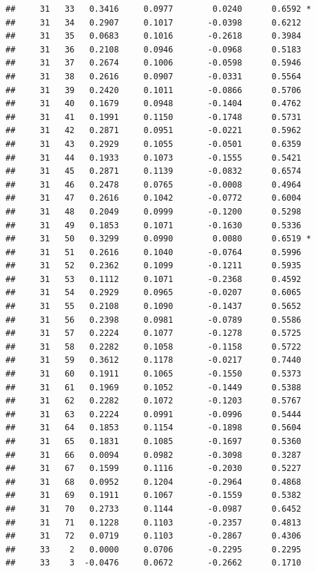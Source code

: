 \documentclass[
]{article}
\begin{document}
\begin{verbatim}
##     31   33   0.3416     0.0977        0.0240      0.6592 *
##     31   34   0.2907     0.1017       -0.0398      0.6212  
##     31   35   0.0683     0.1016       -0.2618      0.3984  
##     31   36   0.2108     0.0946       -0.0968      0.5183  
##     31   37   0.2674     0.1006       -0.0598      0.5946  
##     31   38   0.2616     0.0907       -0.0331      0.5564  
##     31   39   0.2420     0.1011       -0.0866      0.5706  
##     31   40   0.1679     0.0948       -0.1404      0.4762  
##     31   41   0.1991     0.1150       -0.1748      0.5731  
##     31   42   0.2871     0.0951       -0.0221      0.5962  
##     31   43   0.2929     0.1055       -0.0501      0.6359  
##     31   44   0.1933     0.1073       -0.1555      0.5421  
##     31   45   0.2871     0.1139       -0.0832      0.6574  
##     31   46   0.2478     0.0765       -0.0008      0.4964  
##     31   47   0.2616     0.1042       -0.0772      0.6004  
##     31   48   0.2049     0.0999       -0.1200      0.5298  
##     31   49   0.1853     0.1071       -0.1630      0.5336  
##     31   50   0.3299     0.0990        0.0080      0.6519 *
##     31   51   0.2616     0.1040       -0.0764      0.5996  
##     31   52   0.2362     0.1099       -0.1211      0.5935  
##     31   53   0.1112     0.1071       -0.2368      0.4592  
##     31   54   0.2929     0.0965       -0.0207      0.6065  
##     31   55   0.2108     0.1090       -0.1437      0.5652  
##     31   56   0.2398     0.0981       -0.0789      0.5586  
##     31   57   0.2224     0.1077       -0.1278      0.5725  
##     31   58   0.2282     0.1058       -0.1158      0.5722  
##     31   59   0.3612     0.1178       -0.0217      0.7440  
##     31   60   0.1911     0.1065       -0.1550      0.5373  
##     31   61   0.1969     0.1052       -0.1449      0.5388  
##     31   62   0.2282     0.1072       -0.1203      0.5767  
##     31   63   0.2224     0.0991       -0.0996      0.5444  
##     31   64   0.1853     0.1154       -0.1898      0.5604  
##     31   65   0.1831     0.1085       -0.1697      0.5360  
##     31   66   0.0094     0.0982       -0.3098      0.3287  
##     31   67   0.1599     0.1116       -0.2030      0.5227  
##     31   68   0.0952     0.1204       -0.2964      0.4868  
##     31   69   0.1911     0.1067       -0.1559      0.5382  
##     31   70   0.2733     0.1144       -0.0987      0.6452  
##     31   71   0.1228     0.1103       -0.2357      0.4813  
##     31   72   0.0719     0.1103       -0.2867      0.4306  
##     33    2   0.0000     0.0706       -0.2295      0.2295  
##     33    3  -0.0476     0.0672       -0.2662      0.1710  

\end{verbatim}
\end{document}
